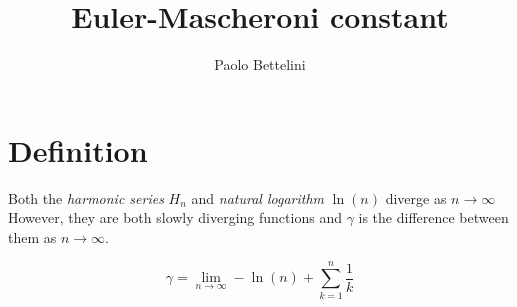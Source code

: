 \documentclass{article}
\title{Euler-Mascheroni constant}
\author{Paolo Bettelini}
\date{}
\begin{document}
\maketitle
\tableofcontents
\pagebreak

\section{Definition}

Both the \textit{harmonic series} \(H_n\) and \textit{natural logarithm} \(\ln(n)\) diverge as \(n\to \infty\) \\
However, they are both slowly diverging functions and \(\gamma\) is the difference between them as \(n\to \infty\).

\[
    \gamma = \lim_{n\to\infty} -\ln(n)+\sum_{k=1}^{n}\frac{1}{k}
\]

\pagebreak
\end{document}

